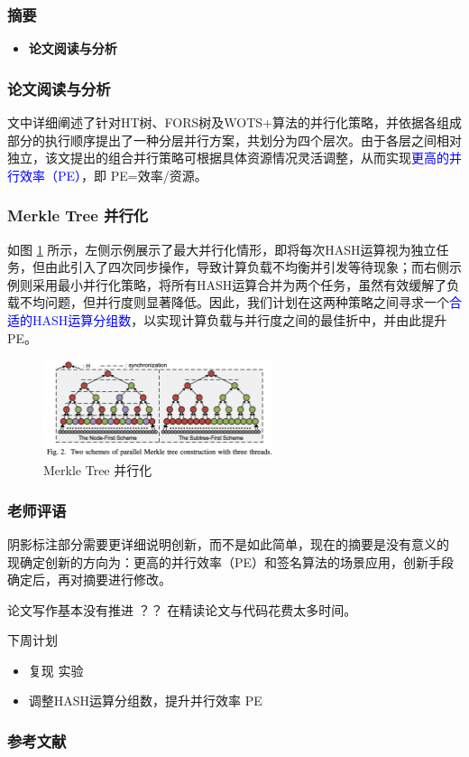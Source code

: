 \documentclass[slide]{../../custom}
\begin{document}
\begin{frame}
  \titlepage
\end{frame}

\begin{frame}
  \frametitle{摘要}
  \begin{itemize}
    \item \textbf{论文阅读与分析}
  \end{itemize}
\end{frame}

\begin{frame}
  \frametitle{论文阅读与分析}
  \cite{Wang2025} 文中详细阐述了针对HT树、FORS树及WOTS+算法的并行化策略，并依据各组成部分的执行顺序提出了一种分层并行方案，共划分为四个层次。由于各层之间相对独立，该文提出的组合并行策略可根据具体资源情况灵活调整，从而实现\textcolor{blue}{更高的并行效率（PE）}，即 PE=效率/资源。

\end{frame}

\begin{frame}
  \frametitle{Merkle Tree 并行化}
  如图 \ref{fig:merkle_tree_paralle} 所示，左侧示例展示了最大并行化情形，即将每次HASH运算视为独立任务，但由此引入了四次同步操作，导致计算负载不均衡并引发等待现象；而右侧示例则采用最小并行化策略，将所有HASH运算合并为两个任务，虽然有效缓解了负载不均问题，但并行度则显著降低。因此，我们计划在这两种策略之间寻求一个\textcolor{blue}{合适的HASH运算分组数}，以实现计算负载与并行度之间的最佳折中，并由此提升PE。
  \begin{figure}[!ht]
    \centering
    \includegraphics[width=0.6\textwidth]{./fig/merkle_tree_paralle.png}
    \caption{Merkle Tree 并行化\cite{Wang2025}}
    \label{fig:merkle_tree_paralle}
  \end{figure}
\end{frame}

\begin{frame}
  \frametitle{老师评语}
  \begin{alertblock}{阴影标注部分需要更详细说明创新，而不是如此简单，现在的摘要是没有意义的}
    现确定创新的方向为：更高的并行效率（PE）和签名算法的场景应用，创新手段确定后，再对摘要进行修改。
  \end{alertblock}
  \begin{alertblock}{论文写作基本没有推进 ？？}
    在精读\cite{Wang2025}论文与代码花费太多时间。
  \end{alertblock}

  \begin{block}{下周计划}
    \begin{itemize}
      \item 复现 \cite{Wang2025} 实验
      \item 调整HASH运算分组数，提升并行效率 PE
    \end{itemize}
  \end{block}
\end{frame}

\begin{frame}
  \frametitle{参考文献}
  
  
\end{frame}
\end{document}

